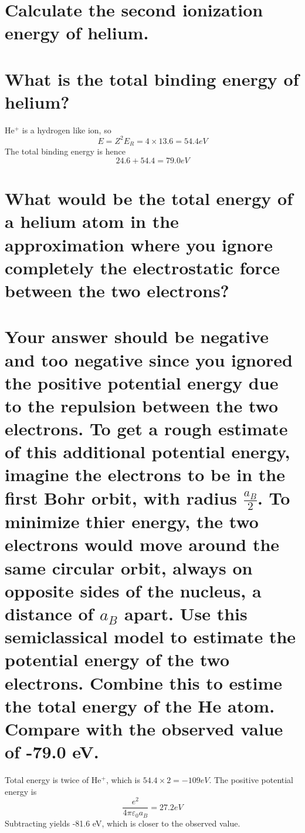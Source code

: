 \documentclass[answers]{exam}
\begin{document}
\begin{questions}
\begin{parts}
	\part{Calculate the second ionization energy of helium.}
	\part{What is the total binding energy of helium?}
\end{parts}

\begin{solution}
	He$^+$ is a hydrogen like ion, so
	$$E = Z^2E_R = 4\times13.6 = 54.4\unit{eV}$$
	The total binding energy is hence
	$$24.6 + 54.4 = 79.0\unit{eV}$$
\end{solution}


\begin{parts}
	\part{What would be the total energy of a helium atom in the approximation where you ignore completely the electrostatic force between the two electrons?}
	\part{Your answer should be negative and too negative since you ignored the positive potential energy due to the repulsion between the two electrons. To get a rough estimate of this additional potential energy, imagine the electrons to be in the first Bohr orbit, with radius $\frac{a_B}{2}$. To minimize thier energy, the two electrons would move around the same circular orbit, always on opposite sides of the nucleus, a distance of $a_B$ apart. Use this semiclassical model to estimate the potential energy of the two electrons. Combine this to estime the total energy of the He atom. Compare with the observed value of -79.0 eV.}
\end{parts}

\begin{solution}
	Total energy is twice of He$^+$, which is $54.4\times2 = -109\unit{eV}$. The positive potential energy is
	$$\frac{e^2}{4\pi\varepsilon_0a_B} =  27.2\unit{eV}$$
	Subtracting yields -81.6 eV, which is closer to the observed value.
\end{solution}


\end{questions}
\end{document}
